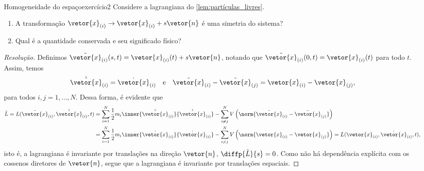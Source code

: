 \begin{exercício}{Homogeneidade do espaço}{exercício2}
    Considere a lagrangiana do \cref{lem:partículas_livres}.
    \begin{enumerate}[label=(\alph*)]
        \item A transformação \(\vetor{x}_{(i)} \to \vetor{x}_{(i)} + s\vetor{n}\) é uma simetria do sistema?
        \item Qual é a quantidade conservada e seu significado físico?
    \end{enumerate}
\end{exercício}
\begin{proof}[Resolução]
    Definimos \(\tilde{\vetor{x}}_{(i)}(s,t) = \vetor{x}_{(i)}(t) + s\vetor{n}\), notando que \(\tilde{\vetor{x}}_{(i)}(0,t) = \vetor{x}_{(i)}(t)\) para todo \(t\). Assim, temos
    \begin{equation*}
        \dot{\tilde{\vetor{x}}}_{(i)} = \dot{\vetor{x}}_{(i)}\quad\text{e}\quad\tilde{\vetor{x}}_{(i)} - \tilde{\vetor{x}}_{(j)} = \vetor{x}_{(i)} - \vetor{x}_{(j)},
    \end{equation*}
    para todos \(i, j = 1, \dots, N.\) Dessa forma, é evidente que
    \begin{align*}
        \tilde{L} = L(\tilde{\vetor{x}}_{(i)}, \dot{\tilde{\vetor{x}}}_{(i)}, t) &= \sum_{i = 1}^N \frac12 m_i \inner{\dot{\tilde{\vetor{x}}}_{(i)}}{\dot{\tilde{\vetor{x}}}_{(i)}} - \sum_{i\neq j}^{N} V\left(\norm{\tilde{\vetor{x}}_{(i)} - \tilde{\vetor{x}}_{(j)}}\right)\\
                                                                                 &= \sum_{i = 1}^N \frac12 m_i \inner{\dot{{\vetor{x}}}_{(i)}}{\dot{{\vetor{x}}}_{(i)}} - \sum_{i\neq j}^{N} V\left(\norm{{\vetor{x}}_{(i)} - {\vetor{x}}_{(j)}}\right) = L(\vetor{x}_{(i)}, \dot{\vetor{x}}_{(i)}, t),
    \end{align*}
    isto é, a lagrangiana é invariante por translações na direção \(\vetor{n}\), \(\diffp{\tilde{L}}{s} = 0\). Como não há dependência explícita com os cossenos diretores de \(\vetor{n}\), segue que a lagrangiana é invariante por translações espaciais.


\end{proof}
